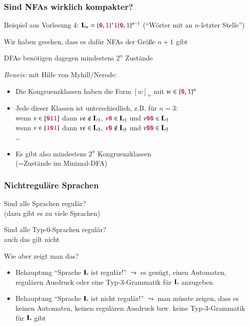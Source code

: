 \documentclass[aspectratio=1610,onlymath]{beamer}
\begin{document}
\begin{frame}\frametitle{Sind NFAs wirklich kompakter?}

Beispiel aus Vorlesung 4:
$\textbf{\textcolor{black}{L}}_n= \{\mathtt{\textcolor{purple}{0}},\mathtt{\textcolor{purple}{1}}\}^* \mathtt{\textcolor{purple}{1}} \{\mathtt{\textcolor{purple}{0}},\mathtt{\textcolor{purple}{1}}\}^{n-1}$
("`Wörter mit  an $n$-letzter Stelle"')
\bigskip

Wir haben gesehen, dass es dafür NFAs der Größe $n+1$ gibt
\bigskip

DFAs benötigen dagegen mindestens $2^n$ Zustände\pause
\bigskip

\emph{Beweis:} mit Hilfe von Myhill/Nerode:
\begin{itemize}
\item Die Kongruenzklassen haben die Form $[w]_\simeq$ mit $w\in\{\mathtt{\textcolor{purple}{0}},\mathtt{\textcolor{purple}{1}}\}^n$
\item Jede dieser Klassen ist unterschiedlich, z.B. für $n=3$:\\
wenn $v\in[\mathtt{\textcolor{purple}{011}}]$ dann $v\epsilon\notin\textbf{\textcolor{black}{L}}_3$, $v\mathtt{\textcolor{purple}{0}}\in\textbf{\textcolor{black}{L}}_3$ und $v\mathtt{\textcolor{purple}{00}}\in\textbf{\textcolor{black}{L}}_3$\\
wenn $v\in[\mathtt{\textcolor{purple}{101}}]$ dann $v\epsilon\in\textbf{\textcolor{black}{L}}_3$, $v\mathtt{\textcolor{purple}{0}}\notin\textbf{\textcolor{black}{L}}_3$ und $v\mathtt{\textcolor{purple}{00}}\in\textbf{\textcolor{black}{L}}_3$\\
\ldots
\item Es gibt also mindestens $2^n$ Kongruenzklassen\\(=Zustände im Minimal-DFA)
\end{itemize}

\end{frame}


\begin{frame}\frametitle{Nichtreguläre Sprachen}

Sind alle Sprachen regulär?\\\pause
{} (dazu gibt es zu viele Sprachen)\pause
\bigskip

Sind alle Typ-0-Sprachen regulär?\\\pause
{} auch das gilt nicht
\bigskip

\alert{Wie aber zeigt man das?}
\begin{itemize}
\item Behauptung "`Sprache $\textbf{\textcolor{black}{L}}$ ist regulär!"' $\leadsto$ es genügt, \alert{einen} Automaten, regulären Ausdruck oder eine Typ-3-Grammatik für $\textbf{\textcolor{black}{L}}$ anzugeben
\item Behauptung "`Sprache $\textbf{\textcolor{black}{L}}$ ist nicht regulär!"' $\leadsto$ man müsste zeigen, dass es \alert{keinen} Automaten, \alert{keinen} regulären Ausdruck bzw. \alert{keine} Typ-3-Grammatik für $\textbf{\textcolor{black}{L}}$ gibt
\end{itemize}

\end{frame}
\end{document}
